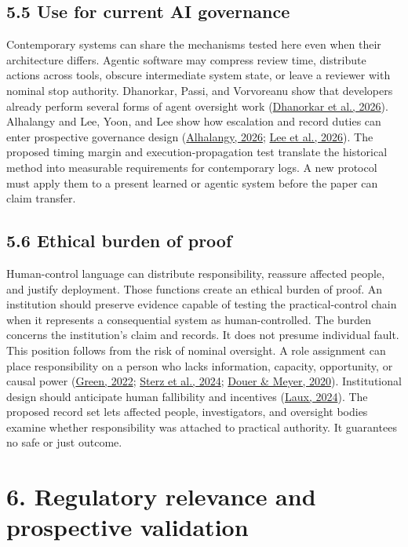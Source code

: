 \documentclass[11pt]{article}
\begin{document}
\subsection*{5.5 Use for current AI governance}
Contemporary systems can share the mechanisms tested here even when their architecture differs. Agentic software may compress review time, distribute actions across tools, obscure intermediate system state, or leave a reviewer with nominal stop authority. Dhanorkar, Passi, and Vorvoreanu show that developers already perform several forms of agent oversight work (\href{https://doi.org/10.1145/3805689.3812402}{Dhanorkar et al., 2026}). Alhalangy and Lee, Yoon, and Lee show how escalation and record duties can enter prospective governance design (\href{https://doi.org/10.3390/info17070694}{Alhalangy, 2026}; \href{https://doi.org/10.3390/systems14070849}{Lee et al., 2026}). The proposed timing margin and execution-propagation test translate the historical method into measurable requirements for contemporary logs. A new protocol must apply them to a present learned or agentic system before the paper can claim transfer.
\subsection*{5.6 Ethical burden of proof}
Human-control language can distribute responsibility, reassure affected people, and justify deployment. Those functions create an ethical burden of proof. An institution should preserve evidence capable of testing the practical-control chain when it represents a consequential system as human-controlled. The burden concerns the institution's claim and records. It does not presume individual fault.
This position follows from the risk of nominal oversight. A role assignment can place responsibility on a person who lacks information, capacity, opportunity, or causal power (\href{https://doi.org/10.1016/j.clsr.2022.105681}{Green, 2022}; \href{https://doi.org/10.1145/3630106.3659051}{Sterz et al., 2024}; \href{https://doi.org/10.1109/TASE.2020.2965466}{Douer \& Meyer, 2020}). Institutional design should anticipate human fallibility and incentives (\href{https://doi.org/10.1007/s00146-023-01777-z}{Laux, 2024}). The proposed record set lets affected people, investigators, and oversight bodies examine whether responsibility was attached to practical authority. It guarantees no safe or just outcome.
\FloatBarrier
\section*{6. Regulatory relevance and prospective validation}
\end{document}
